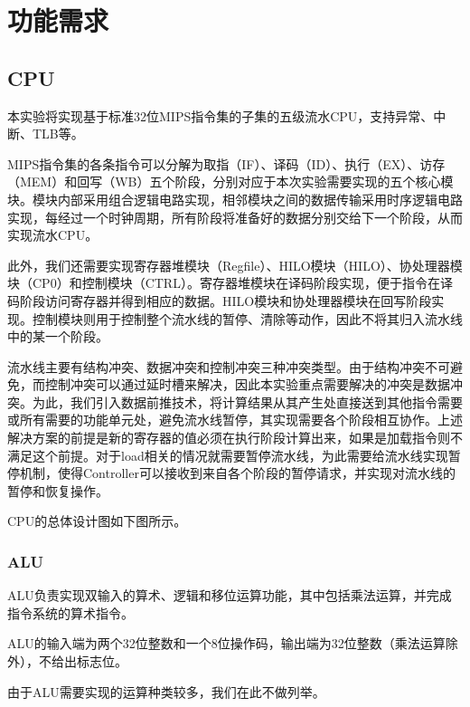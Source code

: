 \section{功能需求}
\subsection{CPU}
本实验将实现基于标准32位MIPS指令集的子集的五级流水CPU，支持异常、中断、TLB等。

MIPS指令集的各条指令可以分解为取指（IF）、译码（ID）、执行（EX）、访存（MEM）和回写（WB）五个阶段，分别对应于本次实验需要实现的五个核心模块。模块内部采用组合逻辑电路实现，相邻模块之间的数据传输采用时序逻辑电路实现，每经过一个时钟周期，所有阶段将准备好的数据分别交给下一个阶段，从而实现流水CPU。

此外，我们还需要实现寄存器堆模块（Regfile）、HILO模块（HILO）、协处理器模块（CP0）和控制模块（CTRL）。寄存器堆模块在译码阶段实现，便于指令在译码阶段访问寄存器并得到相应的数据。HILO模块和协处理器模块在回写阶段实现。控制模块则用于控制整个流水线的暂停、清除等动作，因此不将其归入流水线中的某一个阶段。

流水线主要有结构冲突、数据冲突和控制冲突三种冲突类型。由于结构冲突不可避免，而控制冲突可以通过延时槽来解决，因此本实验重点需要解决的冲突是数据冲突。为此，我们引入数据前推技术，将计算结果从其产生处直接送到其他指令需要或所有需要的功能单元处，避免流水线暂停，其实现需要各个阶段相互协作。上述解决方案的前提是新的寄存器的值必须在执行阶段计算出来，如果是加载指令则不满足这个前提。对于load相关的情况就需要暂停流水线，为此需要给流水线实现暂停机制，使得Controller可以接收到来自各个阶段的暂停请求，并实现对流水线的暂停和恢复操作。

CPU的总体设计图如下图所示。



\subsubsection{ALU}
ALU负责实现双输入的算术、逻辑和移位运算功能，其中包括乘法运算，并完成指令系统的算术指令。

ALU的输入端为两个32位整数和一个8位操作码，输出端为32位整数（乘法运算除外），不给出标志位。

由于ALU需要实现的运算种类较多，我们在此不做列举。


